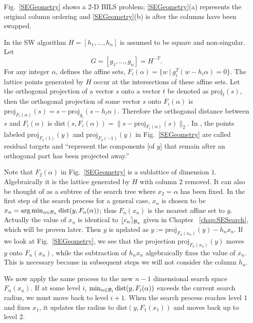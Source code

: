 \documentclass[12pt,Bold,letterpaper]{mcgilletdclass}
\newcommand{\dist}{\mathrm{dist}}
\begin{document}
Fig.\ \ref{SEGeometry} shows a 2-D BILS problem;
\ref{SEGeometry}(a) represents the original column ordering and 
\ref{SEGeometry}(b) is after the columns have been swapped.

In the SW algorithm $H=[h_1,\ldots, h_n]$ is assumed to be square and non-singular.
Let 
$$
G =[g_1,\ldots, g_n]= H^{-T}.
$$ 
For any  integer $\alpha$,   \cite{SuW05} defines the
affine sets, $F_i(\alpha) = \{w \ | \ g_i^T(w-h_i\alpha) = 0\}$.
The lattice points generated by $H$ occur at the intersections of these affine sets. 
Let the orthogonal projection of a vector $s$ onto a vector $t$ be denoted as
$\mbox{proj}_t(s)$, then %
the orthogonal projection of some vector $s$ onto $F_i(\alpha)$ is 
$\mbox{proj}_{F_i(\alpha)}(s) = s -\mbox{proj}_{g_i}(s-h_i\alpha).$ 
Therefore the orthogonal distance between $s$ and
$F_i(\alpha)$ is $\dist(s,F_i(\alpha)) =  \| s - \mbox{proj}_{F_i(\alpha)}(s) \|_2$. 
In \cite{SuW05}, the points labeled $\mbox{proj}_{F_2(1)}(y)$ and
$\mbox{proj}_{F_2(-1)}(y)$ in Fig.\  \ref{SEGeometry}
are called residual targets  and ``represent the
components [of $y$] that remain after an orthogonal part has been projected
away.''  

Note that $F_2(\alpha)$ in Fig.\ \ref{SEGeometry} is a sublattice of dimension $1$.  
Algebraically it is the lattice generated by $H$ with column
$2$ removed. It can also be thought of as a subtree of the search tree where
$x_2 = \alpha$ has been fixed. 
In the first step of the search process for a general case,   $x_n$ is chosen to be
 $x_n=\arg\min_{\alpha\in {\cal B}_n}\dist(y,F_n(\alpha))$; thus $F_n(x_n)$ is the nearest affine set to $y$. 
Actually the value of $x_n$ is identical to $\lfloor c_n \rceil_{{\cal B}_n}$ given in Chapter ~\ref{chap:SESearch},
which will be proven later.
Then   $y$ is updated  as $y := \mbox{proj}_{F_n(x_n)}(y) - h_nx_n$. If we look
at Fig.\ \ref{SEGeometry}, we see that the projection $\mbox{proj}_{F_n(x_n)}(y)$ moves $y$ onto $F_n(x_n)$, while the subtraction of $h_nx_n$ algebraically fixes the value of $x_n$. This is necessary because in subsequent steps we will not consider the column $h_n$.

We now apply the same process to the new $n-1$ dimensional search space
$F_n(x_n)$. If at some level $i$, $\min_{\alpha\in {\cal B}_i}\dist(y,F_i(\alpha))$ exceeds the current
search radius, we must move back to level $i+1$. %
When the search process reaches level $1$ and fixes $x_1$, it updates the radius to  
$\dist(y,F_1(x_1))$ and moves back up to level $2$.
\end{document}

